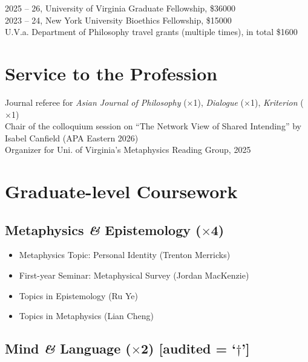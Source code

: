 \documentclass[10pt]{article}
\begin{document}
2025 -- 26, University of Virginia Graduate Fellowship, \$36000\\
2023 -- 24, New York University Bioethics Fellowship, \$15000\\
U.V.a. Department of Philosophy travel grants (multiple times), in total \$1600

\section*{Service to the Profession}

\hangindent=0.8cm Journal referee for \emph{Asian Journal of Philosophy} (\begin{math}\times\end{math}1), \emph{Dialogue} (\begin{math}\times\end{math}1), \emph{Kriterion} (\begin{math}\times\end{math}1)\\

\hangindent=0.8cm Chair of the colloquium session on ``The Network View of Shared Intending'' by Isabel Canfield (APA Eastern 2026)\\

\hangindent=0.8cm Organizer for Uni. of Virginia's Metaphysics Reading Group, 2025

\section*{Graduate-level Coursework}

\subsection*{Metaphysics \emph{\&} Epistemology (\begin{math}\times\end{math}4)}

\begin{itemize}
\item Metaphysics Topic: Personal Identity (Trenton Merricks)
\item First-year Seminar: Metaphysical Survey (Jordan MacKenzie)
\item Topics in Epistemology (Ru Ye)
\item Topics in Metaphysics (Lian Cheng)
\end{itemize}

\subsection*{Mind \emph{\&} Language (\begin{math}\times\end{math}2) [audited = `\begin{math}\dagger\end{math}']}
\end{document}
